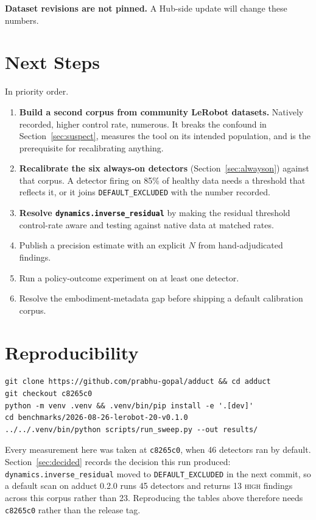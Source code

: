 \documentclass[10pt,a4paper]{article}
\newcommand{\dtr}[1]{\texttt{\small #1}}
\begin{document}
\textbf{Dataset revisions are not pinned.} A Hub-side update will change these numbers.

\section{Next Steps}

In priority order.

\begin{enumerate}\itemsep2pt
\item \textbf{Build a second corpus from community LeRobot datasets.} Natively recorded,
higher control rate, numerous. It breaks the confound in Section~\ref{sec:suspect}, measures
the tool on its intended population, and is the prerequisite for recalibrating anything.
\item \textbf{Recalibrate the six always-on detectors} (Section~\ref{sec:alwayson}) against
that corpus. A detector firing on 85\% of healthy data needs a threshold that reflects it, or
it joins \texttt{DEFAULT\_EXCLUDED} with the number recorded.
\item \textbf{Resolve \dtr{dynamics.inverse\_residual}} by making the residual threshold
control-rate aware and testing against native data at matched rates.
\item Publish a precision estimate with an explicit $N$ from hand-adjudicated findings.
\item Run a policy-outcome experiment on at least one detector.
\item Resolve the embodiment-metadata gap before shipping a default calibration corpus.
\end{enumerate}

\section*{Reproducibility}

\begin{verbatim}
git clone https://github.com/prabhu-gopal/adduct && cd adduct
git checkout c8265c0
python -m venv .venv && .venv/bin/pip install -e '.[dev]'
cd benchmarks/2026-08-26-lerobot-20-v0.1.0
../../.venv/bin/python scripts/run_sweep.py --out results/
\end{verbatim}

Every measurement here was taken at \texttt{c8265c0}, when 46 detectors ran by default.
Section~\ref{sec:decided} records the decision this run produced:
\dtr{dynamics.inverse\_residual} moved to \texttt{DEFAULT\_EXCLUDED} in the next commit, so
a default scan on adduct 0.2.0 runs 45 detectors and returns 13 \textsc{high} findings across
this corpus rather than 23. Reproducing the tables above therefore needs \texttt{c8265c0}
rather than the release tag.
\end{document}
